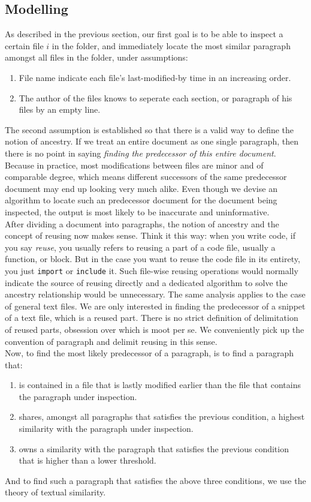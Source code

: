 \documentclass{article}
\begin{document}
\subsection{Modelling}
As described in the previous section, our first goal is to be able to inspect a certain file $i$ in the folder, and immediately locate the most similar paragraph amongst all files in the folder, under assumptions:
\begin{enumerate}
  \item File name indicate each file's last-modified-by time in an increasing order.
  \item The author of the files knows to seperate each section, or paragraph of his files by an empty line. 
\end{enumerate}

The second assumption is established so that there is a valid way to define the notion of ancestry. If we treat an entire document as one single paragraph, then there is no point in saying \textit{finding the predecessor of this entire document}. Because in practice, most modifications between files are minor and of comparable degree, which means different successors of the same predecessor document may end up looking very much alike. Even though we devise an algorithm to locate such an predecessor document for the document being inspected, the output is most likely to be inaccurate and uninformative. \\

After dividing a document into paragraphs, the notion of ancestry and the concept of reusing now makes sense. Think it this way: when you write code, if you say \textit{reuse}, you usually refers to reusing a part of a code file, usually a function, or block. But in the case you want to reuse the code file in its entirety, you just \texttt{import} or \texttt{include} it. Such file-wise reusing operations would normally indicate the source of reusing directly and a dedicated algorithm to solve the ancestry relationship would be unnecessary. The same analysis applies to the case of general text files. We are only interested in finding the predecessor of a snippet of a text file, which is a reused part. There is no strict definition of delimitation of reused parts, obsession over which is moot per se. We conveniently pick up the convention of paragraph and delimit reusing in this sense. \\

Now, to find the most likely predecessor of a paragraph, is to find a paragraph that:
\begin{enumerate}
  \item is contained in a file that is lastly modified earlier than the file that contains the paragraph under inspection.
  \item shares, amongst all paragraphs that satisfies the previous condition, a highest similarity with the paragraph under inspection.
  \item owns a similarity with the paragraph that satisfies the previous condition that is higher than a lower threshold.
\end{enumerate}
And to find such a paragraph that satisfies the above three conditions, we use the theory of textual similarity. \\
\end{document}
